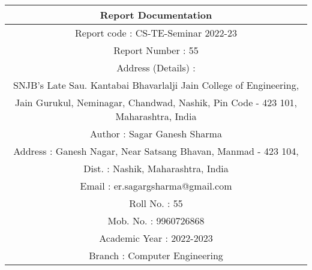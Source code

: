 
\begin{table}
\begin{center}
\begin{tabular}{|c|} \hline 
Report Documentation\\ \hline
Report code : CS-TE-Seminar 2022-23 \\		\hline
Report Number : 55 \\ 		\hline
Address (Details) : \\
SNJB’s Late Sau. Kantabai Bhavarlalji Jain College of Engineering,\\ Jain Gurukul, Neminagar, Chandwad, Nashik, Pin Code - 423 101, Maharashtra, India \\ \hline		
Author     : Sagar Ganesh Sharma \\
Address   : Ganesh Nagar, Near Satsang Bhavan, Manmad - 423 104, \\ Dist. : Nashik, Maharashtra, India \\
Email       : er.sagargsharma@gmail.com \\
Roll No.   : 55 \\
Mob. No. : 9960726868
\\ 	\hline	
Academic Year : 2022-2023 \\
Branch : Computer Engineering
\\ 		\hline


\end{tabular}
\end{center}
\end{table}
